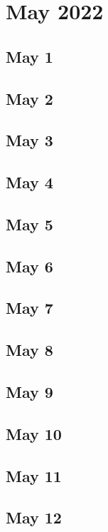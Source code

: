 \chapter{May 2022}

\section{May 1}

\section{May 2}

\section{May 3}

\section{May 4}

\section{May 5}

\section{May 6}

\section{May 7}

\section{May 8}

\section{May 9}

\section{May 10}

\section{May 11}

\section{May 12}

